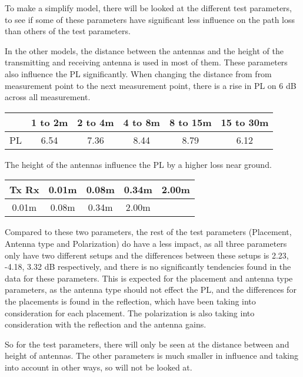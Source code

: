 To make a simplify model, there will be looked at the different test parameters, to see if some of these parameters have significant less influence on the path loss than others of the test parameters.

In the other models, the distance between the antennas and the height of the transmitting and receiving antenna is used in most of them. These parameters also influence the PL significantly. When changing the distance from from measurement point to the next measurement point, there is a rise in PL on 6 dB across all measurement.

\begin{tabular}{|c|c|c|c|c|c|}
\hline
   & 1 to 2m & 2 to 4m & 4 to 8m & 8 to 15m & 15 to 30m \\
\hline
PL & 6.54 & 7.36 & 8.44 & 8.79 & 6.12 \\
\hline
\end{tabular}

The height of the antennas influence the PL by a higher loss near ground.

\begin{tabular}{|c|c|c|c|c|}
\hline
Tx Rx & 0.01m & 0.08m & 0.34m & 2.00m \\
\hline
0.01m & 
\hline
0.08m & 
\hline
0.34m & 
\hline
2.00m & 
\hline
\end{tabular}

Compared to these two parameters, the rest of the test parameters (Placement, Antenna type and Polarization) do have a less impact, as all three parameters only have two different setups and the differences between these setups is 2.23, -4.18, 3.32 dB respectively, and there is no significantly tendencies found in the data for these parameters. This is expected for the placement and antenna type parameters, as the antenna type should not effect the PL, and the differences for the placements is found in the reflection, which have been taking into consideration for each placement. The polarization is also taking into consideration with the reflection and the antenna gains.

So for the test parameters, there will only be seen at the distance between and height of antennas. The other parameters is much smaller in influence and taking into account in other ways, so will not be looked at.

